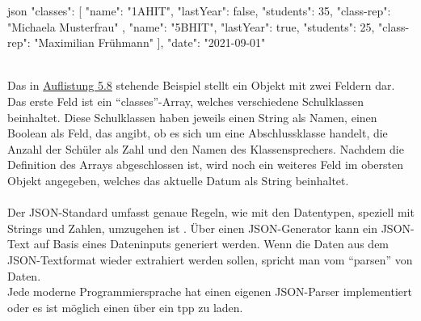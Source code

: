 		\begin{code}{json}
		{
			"classes": [
				{
					"name": "1AHIT",
					"lastYear": false,
					"students": 35,
					"class-rep": "Michaela Musterfrau"
				},
				{
					"name": "5BHIT",
					"lastYear": true,
					"students": 25,
					"class-rep": "Maximilian Frühmann"
				}
			],
			"date": "2021-09-01"
		}
		\end{code}
		\label{code:json}~\\
		Das in \hyperref[code:json]{Auflistung 5.8} stehende Beispiel stellt ein Objekt mit zwei Feldern dar. Das erste Feld ist ein \enquote{classes}-Array, welches verschiedene Schulklassen beinhaltet. Diese Schulklassen haben jeweils einen String als Namen, einen Boolean als Feld, das angibt, ob es sich um eine Abschlussklasse handelt, die Anzahl der Schüler als Zahl und den Namen des Klassensprechers. Nachdem die Definition des Arrays abgeschlossen ist, wird noch ein weiteres Feld im obersten Objekt angegeben, welches das aktuelle Datum als String beinhaltet.
		\\~\\
		Der JSON-Standard umfasst genaue Regeln, wie mit den Datentypen, speziell mit Strings und Zahlen, umzugehen ist \cite{rfc4627}.
		Über einen JSON-Generator kann ein JSON-Text auf Basis eines Dateninputs generiert werden. Wenn die Daten aus dem JSON-Textformat wieder extrahiert werden sollen, spricht man vom \enquote{parsen} von Daten.\\
		Jede moderne Programmiersprache hat einen eigenen JSON-Parser implementiert oder es ist möglich einen über ein \Gls{tpp} zu laden.
